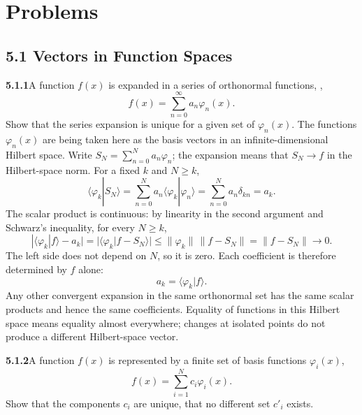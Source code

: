 
\section*{Problems}

\subsection*{5.1 Vectors in Function Spaces}

\par\bigskip
\noindent\textbf{5.1.1}\quad A function $f(x)$ is expanded in a series of
orthonormal functions, ,
\[
f(x)=\sum_{n=0}^{\infty}a_{n}\varphi_{n}(x).
\]
Show that the series expansion is unique for a given set of $\varphi_{n}(x)$.
The functions $\varphi_{n}(x)$ are being taken here as the basis vectors in an
infinite-dimensional Hilbert space.
\solution
Write $S_N=\sum_{n=0}^N a_n\varphi_n$; the expansion means that
$S_N\to f$ in the Hilbert-space norm.
For a fixed $k$ and $N\ge k$,
\[
\langle\varphi_k|S_N\rangle
=\sum_{n=0}^N a_n\langle\varphi_k|\varphi_n\rangle
=\sum_{n=0}^N a_n\delta_{kn}=a_k.
\]
The scalar product is continuous: by linearity in the second argument and
Schwarz's inequality, for every $N\ge k$,
\[
|\langle\varphi_k|f\rangle-a_k|
=|\langle\varphi_k|f-S_N\rangle|
\le\|\varphi_k\|\,\|f-S_N\|=\|f-S_N\|\longrightarrow0.
\]
The left side does not depend on $N$, so it is zero. Each coefficient is
therefore determined by $f$ alone:
\[
\boxed{a_k=\langle\varphi_k|f\rangle}.
\]
Any other convergent expansion in the same orthonormal set has the same
scalar products and hence the same coefficients. Equality of functions in
this Hilbert space means equality almost everywhere; changes at isolated
points do not produce a different Hilbert-space vector.

\par\bigskip
\noindent\textbf{5.1.2}\quad A function $f(x)$ is represented by a finite set
of basis functions $\varphi_{i}(x)$,
\[
f(x)=\sum_{i=1}^{N}c_{i}\varphi_{i}(x).
\]
Show that the components $c_{i}$ are unique, that no different set $c'_{i}$
exists.

